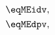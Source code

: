 \begin{equation} \label{eq:nME}
	\begin{aligned}
		\eqMEidv, \\
		\eqMEdpv,
	\end{aligned}
\end{equation}
